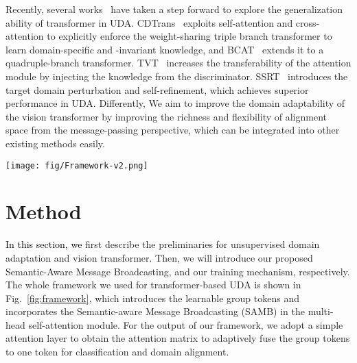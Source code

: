 \documentclass[journal]{IEEEtran}
\newcommand{\tco}{\textcolor{black}}
\begin{document}
Recently, several works~\cite{xu2021cdtransCDTrans, ma2021exploitingWinTR, yang2021tvtTVT, sun2022safeSSRT, hoyer2022daformerDAformer} have taken a step forward to explore the generalization ability of transformer in UDA. CDTrans~\cite{xu2021cdtransCDTrans} exploits self-attention and cross-attention to explicitly enforce the weight-sharing triple branch transformer to learn domain-specific and -invariant knowledge, and BCAT~\cite{wang2022domainBCAT} extends it to a quadruple-branch transformer. TVT~\cite{yang2021tvtTVT} increases the transferability of  the attention module 
by injecting the knowledge from the discriminator. SSRT~\cite{sun2022safeSSRT} introduces the target domain perturbation and self-refinement, which achieves superior performance in UDA. Differently, 
We aim to improve the domain adaptability of the vision transformer by improving
the richness and flexibility of alignment space from the message-passing perspective, which can be integrated into other existing methods easily.



\begin{figure*}[htp]
    \centering
    \texttt{[image: fig/Framework-v2.png]}
    \caption{The framework of ViT by incorporating our proposed Semantic-aware Message Broadcasting (SAMB).  and  are the group tokens and image tokens, respectively. , ,  represent the query, key, and value projected with weights , , .  We implement SAMB with our carefully designed attention mask , . Here,  is adaptively generated with the Gumbel softmax~\cite{jang2016categoricalGumbelsoftmax} based on the correlation between the semantics/contents of image tokens and group tokens. We adopt a simple attention layer to obtain the attention matrix  to fuse the  group tokens to a token and conduct the classification and domain alignment on this token.}
    \label{fig:framework}
\end{figure*}


\section{Method}
\label{sec:methods}
\tco{In this section, we} first describe the preliminaries for unsupervised domain adaptation and vision transformer. Then, we will introduce our proposed Semantic-Aware Message Broadcasting, and our  training mechanism, respectively. The whole framework we used for transformer-based UDA is shown in Fig.~\ref{fig:framework}, which introduces the learnable group tokens and incorporates the Semantic-aware Message Broadcasting (SAMB) in the multi-head self-attention module. For the output  of our framework, we adopt a simple attention layer to obtain the attention matrix  to adaptively fuse the  group tokens to one token for classification and domain alignment. 
\end{document}
